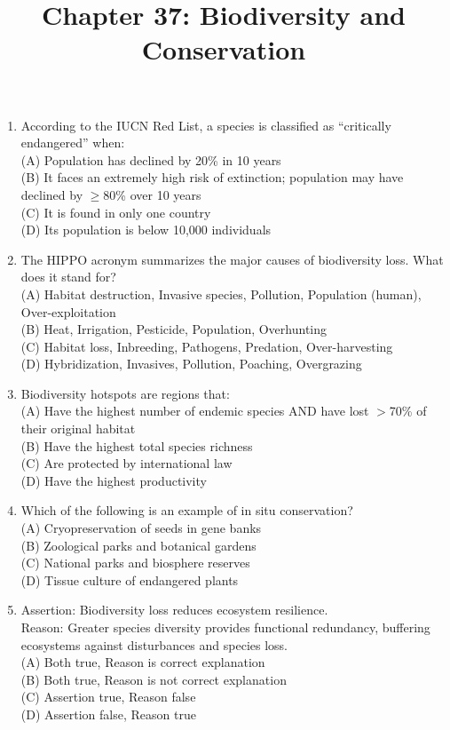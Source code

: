 \documentclass{article}
\begin{document}
\title{Chapter 37: Biodiversity and Conservation}
\date{}
\maketitle

\begin{enumerate}[label=Q\arabic*.]

\item According to the IUCN Red List, a species is classified as ``critically endangered'' when:
\\(A) Population has declined by 20\% in 10 years
\\(B) It faces an extremely high risk of extinction; population may have declined by $\geq$80\% over 10 years
\\(C) It is found in only one country
\\(D) Its population is below 10,000 individuals

\item The HIPPO acronym summarizes the major causes of biodiversity loss. What does it stand for?
\\(A) Habitat destruction, Invasive species, Pollution, Population (human), Over-exploitation
\\(B) Heat, Irrigation, Pesticide, Population, Overhunting
\\(C) Habitat loss, Inbreeding, Pathogens, Predation, Over-harvesting
\\(D) Hybridization, Invasives, Pollution, Poaching, Overgrazing

\item Biodiversity hotspots are regions that:
\\(A) Have the highest number of endemic species AND have lost $>$70\% of their original habitat
\\(B) Have the highest total species richness
\\(C) Are protected by international law
\\(D) Have the highest productivity

\item Which of the following is an example of in situ conservation?
\\(A) Cryopreservation of seeds in gene banks
\\(B) Zoological parks and botanical gardens
\\(C) National parks and biosphere reserves
\\(D) Tissue culture of endangered plants

\item Assertion: Biodiversity loss reduces ecosystem resilience.\\
Reason: Greater species diversity provides functional redundancy, buffering ecosystems against disturbances and species loss.
\\(A) Both true, Reason is correct explanation
\\(B) Both true, Reason is not correct explanation
\\(C) Assertion true, Reason false
\\(D) Assertion false, Reason true


\end{enumerate}
\end{document}
